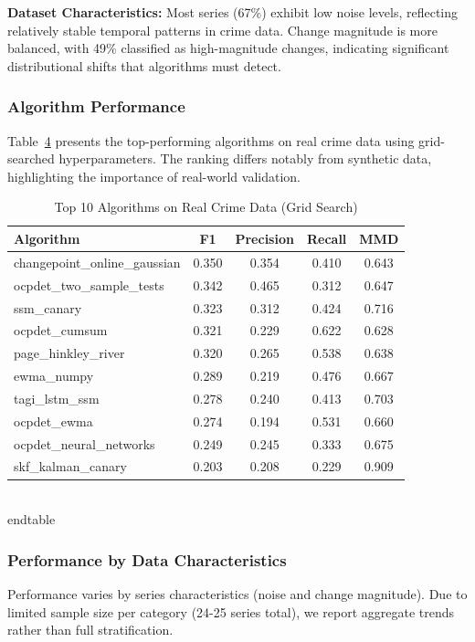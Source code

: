 \begin{table}[H]
\begin{table}[H]
\begin{table}[H]
\textbf{Dataset Characteristics:} Most series (67\%) exhibit low noise levels, reflecting relatively stable temporal patterns in crime data. Change magnitude is more balanced, with 49\% classified as high-magnitude changes, indicating significant distributional shifts that algorithms must detect.


\subsubsection{Algorithm Performance}

Table~\ref{tab:real_top10} presents the top-performing algorithms on real crime data using grid-searched hyperparameters. The ranking differs notably from synthetic data, highlighting the importance of real-world validation.

\begin{table}[H]
\centering
\caption{Top 10 Algorithms on Real Crime Data (Grid Search)}
\label{tab:real_top10}
\small
\begin{tabular}{lcccc}
\toprule
\textbf{Algorithm} & \textbf{F1} & \textbf{Precision} & \textbf{Recall} & \textbf{MMD} \\
\midrule
changepoint\_online\_gaussian & 0.350 & 0.354 & 0.410 & 0.643 \\
ocpdet\_two\_sample\_tests & 0.342 & 0.465 & 0.312 & 0.647 \\
ssm\_canary & 0.323 & 0.312 & 0.424 & 0.716 \\
ocpdet\_cumsum & 0.321 & 0.229 & 0.622 & 0.628 \\
page\_hinkley\_river & 0.320 & 0.265 & 0.538 & 0.638 \\
ewma\_numpy & 0.289 & 0.219 & 0.476 & 0.667 \\
tagi\_lstm\_ssm & 0.278 & 0.240 & 0.413 & 0.703 \\
ocpdet\_ewma & 0.274 & 0.194 & 0.531 & 0.660 \\
ocpdet\_neural\_networks & 0.249 & 0.245 & 0.333 & 0.675 \\
skf\_kalman\_canary & 0.203 & 0.208 & 0.229 & 0.909 \\
\bottomrule
\end{tabular}
\\end{table}


\subsubsection{Performance by Data Characteristics}

Performance varies by series characteristics (noise and change magnitude). Due to limited sample size per category (24-25 series total), we report aggregate trends rather than full stratification.




\end{table}
\end{table}
\end{table}
\end{table}
